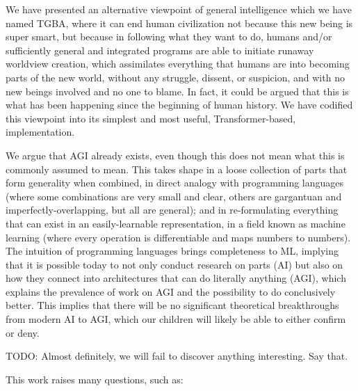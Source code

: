 \documentclass{article}
\begin{document}
We have presented an alternative viewpoint of general intelligence which we have named TGBA, where it can end human civilization not because this new being is super smart, but because in following what they want to do, humans and/or sufficiently general and integrated programs are able to initiate runaway worldview creation, which assimilates everything that humans are into becoming parts of the new world, without any struggle, dissent, or suspicion, and with no new beings involved and no one to blame. In fact, it could be argued that this is what has been happening since the beginning of human history. We have codified this viewpoint into its simplest and most useful, Transformer-based, implementation.

We argue that AGI already exists, even though this does not mean what this is commonly assumed to mean. This takes shape in a loose collection of parts that form generality when combined, in direct analogy with programming languages (where some combinations are very small and clear, others are gargantuan and imperfectly-overlapping, but all are general); and in re-formulating everything that can exist in an easily-learnable representation, in a field known as machine learning (where every operation is differentiable and maps numbers to numbers). The intuition of programming languages brings completeness to ML, implying that it is possible today to not only conduct research on parts (AI) but also on how they connect into architectures that can do literally anything (AGI), which explains the prevalence of work on AGI and the possibility to do conclusively better. This implies that there will be no significant theoretical breakthroughs from modern AI to AGI, which our children will likely be able to either confirm or deny.

    TODO: Almost definitely, we will fail to discover anything interesting. Say that.

This work raises many questions, such as:
\end{document}
